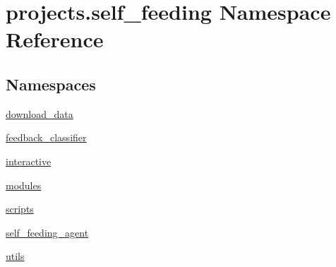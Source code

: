 \hypertarget{namespaceprojects_1_1self__feeding}{}\section{projects.\+self\+\_\+feeding Namespace Reference}
\label{namespaceprojects_1_1self__feeding}
\subsection*{Namespaces}
\begin{DoxyCompactItemize}
\item 
 \hyperlink{namespaceprojects_1_1self__feeding_1_1download__data}{download\+\_\+data}
\item 
 \hyperlink{namespaceprojects_1_1self__feeding_1_1feedback__classifier}{feedback\+\_\+classifier}
\item 
 \hyperlink{namespaceprojects_1_1self__feeding_1_1interactive}{interactive}
\item 
 \hyperlink{namespaceprojects_1_1self__feeding_1_1modules}{modules}
\item 
 \hyperlink{namespaceprojects_1_1self__feeding_1_1scripts}{scripts}
\item 
 \hyperlink{namespaceprojects_1_1self__feeding_1_1self__feeding__agent}{self\+\_\+feeding\+\_\+agent}
\item 
 \hyperlink{namespaceprojects_1_1self__feeding_1_1utils}{utils}
\end{DoxyCompactItemize}
